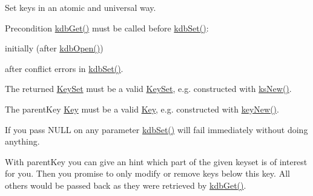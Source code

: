Set keys in an atomic and universal way. \begin{DoxyPrecond}{Precondition}
\hyperlink{group__kdb_ga28e385fd9cb7ccfe0b2f1ed2f62453a1}{kdb\+Get()} must be called before \hyperlink{group__kdb_ga11436b058408f83d303ca5e996832bcf}{kdb\+Set()}\+:
\begin{DoxyItemize}
\item initially (after \hyperlink{group__kdb_ga6808defe5870f328dd17910aacbdc6ca}{kdb\+Open()})
\item after conflict errors in \hyperlink{group__kdb_ga11436b058408f83d303ca5e996832bcf}{kdb\+Set()}.
\end{DoxyItemize}

The {\ttfamily returned} \hyperlink{classkdb_1_1KeySet}{Key\+Set} must be a valid \hyperlink{classkdb_1_1KeySet}{Key\+Set}, e.\+g. constructed with \hyperlink{group__keyset_ga671e1aaee3ae9dc13b4834a4ddbd2c3c}{ks\+New()}.

The {\ttfamily parent\+Key} \hyperlink{classkdb_1_1Key}{Key} must be a valid \hyperlink{classkdb_1_1Key}{Key}, e.\+g. constructed with \hyperlink{group__key_gad23c65b44bf48d773759e1f9a4d43b89}{key\+New()}.
\end{DoxyPrecond}
If you pass N\+U\+LL on any parameter \hyperlink{group__kdb_ga11436b058408f83d303ca5e996832bcf}{kdb\+Set()} will fail immediately without doing anything.

With {\ttfamily parent\+Key} you can give an hint which part of the given keyset is of interest for you. Then you promise to only modify or remove keys below this key. All others would be passed back as they were retrieved by \hyperlink{group__kdb_ga28e385fd9cb7ccfe0b2f1ed2f62453a1}{kdb\+Get()}.


